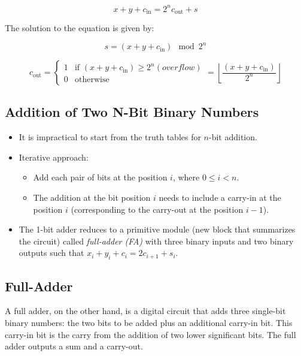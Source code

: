 \documentclass[12pt,openany]{book}
\begin{document}
			      	\begin{equation}
			      		x + y + c_{\text{in}} = 2^n c_{\text{out}} + s
			      	\end{equation}
			      	
			      	The solution to the equation is given by:
			      	
			      	\begin{equation}
			      		s = (x + y + c_{\text{in}}) \mod 2^n
			      	\end{equation}
			      	
			      	\begin{equation}
			      		c_{\text{out}} = 
			      		\begin{cases} 
			      			1 & \text{if } (x + y + c_{\text{in}}) \geq 2^n (overflow) \\
			      			0 & \text{otherwise}                                       
			      		\end{cases}
			      		= \left\lfloor \frac{(x + y + c_{\text{in}})}{2^n} \right\rfloor
			      	\end{equation}
			      	\subsection{Addition of Two N-Bit Binary Numbers}
			      	
			      	\begin{itemize}
			      		\item[] It is impractical to start from the truth tables for \( n \)-bit addition.
			      		\item[] Iterative approach:
			      		      \begin{itemize}
			      		      	\item[] Add each pair of bits at the position \( i \), where \( 0 \leq i < n \).
			      		      	\item[] The addition at the bit position \( i \) needs to include a carry-in at the position \( i \) (corresponding to the carry-out at the position \( i - 1 \)).
			      		      \end{itemize}
			      		\item[] The 1-bit adder reduces to a primitive module (new block that summarizes the circuit) called \textit{full-adder (FA)} with three binary inputs and two binary outputs such that \newline \( x_i + y_i + c_i = 2c_{i+1} + s_i \).
			      	\end{itemize}
			      	\newpage
			      	\subsection{Full-Adder}
			      	A full adder, on the other hand, is a digital circuit that adds three single-bit binary numbers: the two bits to be added plus an additional carry-in bit. This carry-in bit is the carry from the addition of two lower significant bits. The full adder outputs a sum and a carry-out.
			      	
\end{document}
